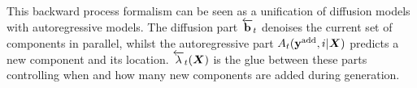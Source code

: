 This backward process formalism can be seen as a unification of diffusion models with autoregressive models. The diffusion part $\overleftarrow{\mathbf{b}}_t$ denoises the current set of components in parallel, whilst the autoregressive part $A_t(\mathbf{y}^{\textup{add}}, i | {\bm{X}})$ predicts a new component and its location. $\overleftarrow{\lambda}_t({\bm{X}})$ is the glue between these parts controlling when and how many new components are added during generation.


